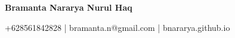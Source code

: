 \begin{center}
    \textbf{\huge Bramanta Nararya Nurul Haq}
\end{center}

\begin{center}
    +628561842828 | bramanta.n@gmail.com | bnararya.github.io
\end{center}